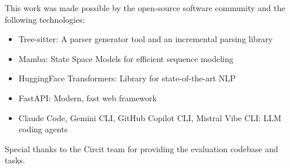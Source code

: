 
This work was made possible by the open-source software community and the following technologies:

\begin{itemize}
    \item Tree-sitter: A parser generator tool and an incremental parsing library
    \item Mamba: State Space Models for efficient sequence modeling
    \item HuggingFace Transformers: Library for state-of-the-art NLP
    \item FastAPI: Modern, fast web framework
    \item Claude Code, Gemini CLI, GitHub Copilot CLI, Mistral Vibe CLI: LLM coding agents
\end{itemize}

Special thanks to the Circit team for providing the evaluation codebase and tasks.

